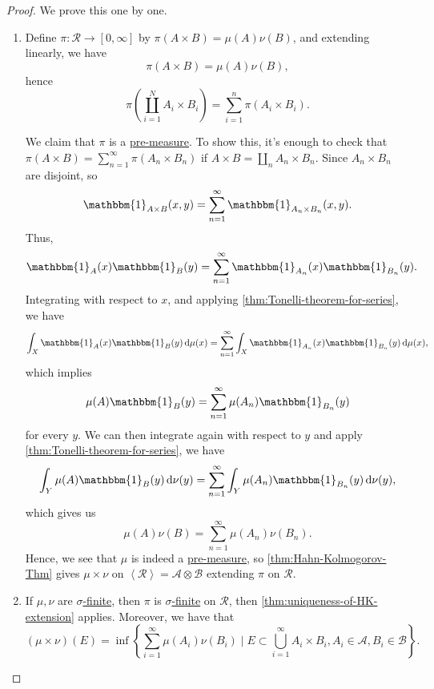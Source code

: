 \begin{proof}
	We prove this one by one.
	\begin{enumerate}[(1)]
		\item Define \(\pi \colon \mathcal{R} \to [0, \infty ]\) by \(\pi (A \times B) = \mu (A)\nu (B)\), and extending linearly, we have
		      \[
			      \pi (A\times B) = \mu (A)\nu (B),
		      \]
		      hence
		      \[
			      \pi \left(\coprod\limits_{i=1}^{N} A_{i} \times B_{i} \right) = \sum\limits_{i=1}^{n} \pi (A_{i} \times B_{i}).
		      \]

		      We claim that \(\pi \) is a \hyperref[def:pre-measure]{pre-measure}. To show this, it's enough to check that \(\pi (A\times B) = \sum\limits_{n=1}^{\infty} \pi (A_{n} \times B_{n} )\)
		      if \(A\times B = \coprod\limits_{n}A_{n} \times B_{n}  \). Since \(A_{n} \times B_{n} \) are disjoint, so
		      \[
			      \mathbbm{1}_{A\times B}(x, y) = \sum\limits_{n=1}^{\infty} \mathbbm{1}_{A_{n} \times B_{n} }(x, y).
		      \]
		      Thus,
		      \[
			      \mathbbm{1}_{A} (x)\mathbbm{1}_{B} (y) = \sum\limits_{n=1}^{\infty} \mathbbm{1}_{A_{n} }(x)\mathbbm{1}_{B_{n}}(y).
		      \]
		      Integrating with respect to \(x\), and applying \autoref{thm:Tonelli-theorem-for-series}, we have
		      \[
			      \int _X \mathbbm{1}_{A} (x)\mathbbm{1}_{B}(y)\,\mathrm{d} \mu (x) = \sum\limits_{n=1}^{\infty} \int _X \mathbbm{1}_{A_{n} }(x)\mathbbm{1}_{B_{n} }(y)\,\mathrm{d} \mu (x),
		      \]
		      which implies
		      \[
			      \mu (A)\mathbbm{1}_{B} (y) = \sum\limits_{n=1}^{\infty} \mu (A_{n} )\mathbbm{1}_{B_{n} }(y)
		      \]
		      for every \(y\). We can then integrate again with respect to \(y\) and apply \autoref{thm:Tonelli-theorem-for-series}, we have
		      \[
			      \int _Y \mu (A)\mathbbm{1}_{B}(y)\,\mathrm{d} \nu (y) = \sum\limits_{n=1}^{\infty} \int _Y \mu (A_{n} )\mathbbm{1}_{B_{n} }(y)\,\mathrm{d} \nu (y),
		      \]
		      which gives us
		      \[
			      \mu (A)\nu (B) = \sum\limits_{n=1}^{\infty} \mu (A_{n} )\nu (B_{n} ).
		      \]
		      Hence, we see that \(\mu\) is indeed a \hyperref[def:pre-measure]{pre-measure}, so  \autoref{thm:Hahn-Kolmogorov-Thm} gives \(\mu \times \nu \) on \(\left< \mathcal{R}  \right> = \mathcal{A} \otimes \mathcal{B}  \)
		      extending \(\pi \) on \(\mathcal{R} \).
		\item If \(\mu , \nu \) are \hyperref[def:sigma-finite-measure]{\(\sigma\)-finite}, then \(\pi \) is  \hyperref[def:sigma-finite-measure]{\(\sigma\)-finite} on \(\mathcal{R} \), then
		      \autoref{thm:uniqueness-of-HK-extension} applies. Moreover, we have that
		      \[
			      (\mu \times \nu )(E) = \inf \left\{\sum\limits_{i=1}^{\infty} \mu (A_{i})\nu (B_{i})\mid E\subset \bigcup\limits_{i=1}^{\infty} A_{i} \times B_{i}, A_{i} \in \mathcal{A} , B_{i} \in \mathcal{B} \right\}.
		      \]
	\end{enumerate}
\end{proof}

